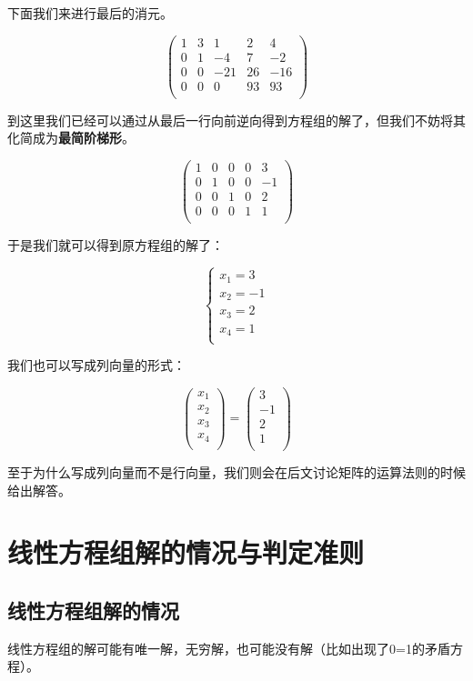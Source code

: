 \documentclass[a4paper]{ctexart}
\begin{document}
下面我们来进行最后的消元。

$$
\begin{pmatrix}
1&3&1&2&4\\
0&1&-4&7&-2\\
0&0&-21&26&-16\\
0&0&0&93&93\\
\end{pmatrix}
$$

到这里我们已经可以通过从最后一行向前逆向得到方程组的解了，但我们不妨将其化简成为\textbf{最简阶梯形}。

$$
\begin{pmatrix}
1&0&0&0&3\\
0&1&0&0&-1\\
0&0&1&0&2\\
0&0&0&1&1\\
\end{pmatrix}
$$

于是我们就可以得到原方程组的解了：

$$
\begin{cases}
x_{1}=3\\
x_{2}=-1\\
x_{3}=2\\
x_{4}=1\\
\end{cases}
$$

我们也可以写成列向量的形式：

$$
\left(
\begin{array}{cccc}
 x_{1}\\
 x_{2}\\
 x_{3}\\
 x_{4}\\
\end{array}
\right )
=
\left(
\begin{array}{cccc}
3\\
-1\\
2 \\
1\\
\end{array}
\right )
$$

至于为什么写成列向量而不是行向量，我们则会在后文讨论矩阵的运算法则的时候给出解答。

\section{线性方程组解的情况与判定准则}
\subsection{线性方程组解的情况}
线性方程组的解可能有唯一解，无穷解，也可能没有解（比如出现了0=1的矛盾方程）。
\end{document}
